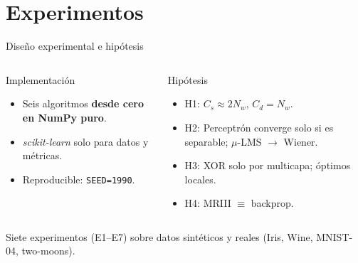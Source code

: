 \documentclass[aspectratio=169, 11pt, xcolor={dvipsnames,table}]{beamer}
\newcommand{\azul}[1]{\textcolor{UsachAzul}{#1}}
\begin{document}
\section{Experimentos}

\begin{frame}{Diseño experimental e hipótesis}
\begin{columns}[T]
\begin{block}{Implementación}
\begin{itemize}
  \item Seis algoritmos \textbf{desde cero en NumPy puro}.
  \item \emph{scikit-learn} solo para datos y métricas.
  \item Reproducible: \texttt{SEED=1990}.
\end{itemize}
\end{block}
\begin{block}{Hipótesis}
\begin{itemize}
  \item \azul{H1}: $C_s\approx2N_w$, $C_d=N_w$.
  \item \azul{H2}: Perceptrón converge solo si es separable; $\mu$-LMS $\to$ Wiener.
  \item \azul{H3}: XOR solo por multicapa; óptimos locales.
  \item \azul{H4}: MRIII $\equiv$ backprop.
\end{itemize}
\end{block}
\end{columns}
\begin{tipbox}
Siete experimentos (E1--E7) sobre datos sintéticos y reales (Iris, Wine, MNIST-04, two-moons).
\end{tipbox}
\end{frame}
\end{document}
